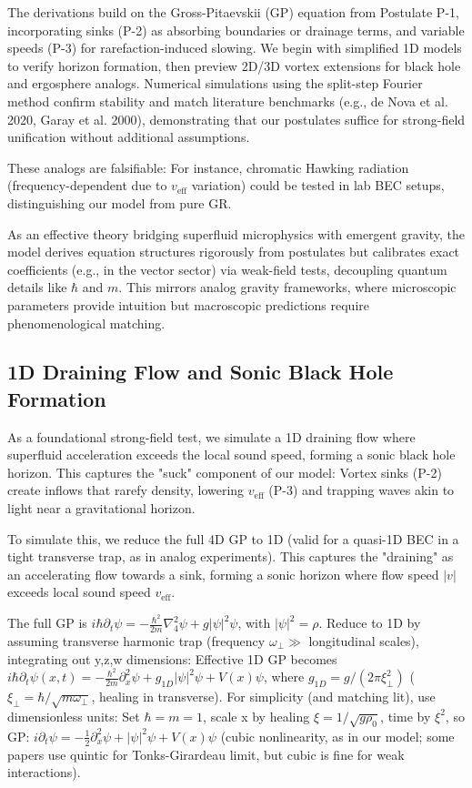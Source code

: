 \documentclass{article}
\begin{document}
The derivations build on the Gross-Pitaevskii (GP) equation from Postulate P-1, incorporating sinks (P-2) as absorbing boundaries or drainage terms, and variable speeds (P-3) for rarefaction-induced slowing. We begin with simplified 1D models to verify horizon formation, then preview 2D/3D vortex extensions for black hole and ergosphere analogs. Numerical simulations using the split-step Fourier method confirm stability and match literature benchmarks (e.g., de Nova et al. 2020, Garay et al. 2000), demonstrating that our postulates suffice for strong-field unification without additional assumptions.

These analogs are falsifiable: For instance, chromatic Hawking radiation (frequency-dependent due to $v_{\text{eff}}$ variation) could be tested in lab BEC setups, distinguishing our model from pure GR.

As an effective theory bridging superfluid microphysics with emergent gravity, the model derives equation structures rigorously from postulates but calibrates exact coefficients (e.g., in the vector sector) via weak-field tests, decoupling quantum details like $\hbar$ and $m$. This mirrors analog gravity frameworks, where microscopic parameters provide intuition but macroscopic predictions require phenomenological matching.

\subsection{1D Draining Flow and Sonic Black Hole Formation}

As a foundational strong-field test, we simulate a 1D draining flow where superfluid acceleration exceeds the local sound speed, forming a sonic black hole horizon. This captures the "suck" component of our model: Vortex sinks (P-2) create inflows that rarefy density, lowering $v_{\text{eff}}$ (P-3) and trapping waves akin to light near a gravitational horizon.

To simulate this, we reduce the full 4D GP to 1D (valid for a quasi-1D BEC in a tight transverse trap, as in analog experiments). This captures the "draining" as an accelerating flow towards a sink, forming a sonic horizon where flow speed $|v|$ exceeds local sound speed $v_{\text{eff}}$.

The full GP is $i \hbar \partial_t \psi = -\frac{\hbar^2}{2m} \nabla_4^2 \psi + g |\psi|^2 \psi$, with $|\psi|^2 = \rho$. Reduce to 1D by assuming transverse harmonic trap (frequency $\omega_\perp \gg$ longitudinal scales), integrating out y,z,w dimensions: Effective 1D GP becomes $i \hbar \partial_t \psi(x,t) = -\frac{\hbar^2}{2m} \partial_x^2 \psi + g_{1D} |\psi|^2 \psi + V(x) \psi$, where $g_{1D} = g / (2\pi \xi_\perp^2)$ ($\xi_\perp = \hbar / \sqrt{m \omega_\perp}$, healing in transverse). For simplicity (and matching lit), use dimensionless units: Set $\hbar = m = 1$, scale x by healing $\xi = 1 / \sqrt{g \rho_0}$, time by $\xi^2$, so GP: $i \partial_t \psi = -\frac{1}{2} \partial_x^2 \psi + |\psi|^2 \psi + V(x) \psi$ (cubic nonlinearity, as in our model; some papers use quintic for Tonks-Girardeau limit, but cubic is fine for weak interactions).
\end{document}
